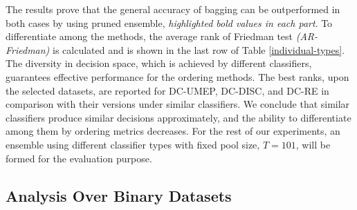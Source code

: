The results prove that the general accuracy of bagging can be outperformed in both cases by using pruned ensemble, \textit{highlighted bold values in each part}. To differentiate among the methods, the average rank of Friedman test \cite{friedman1937} \textit{(AR-Friedman)} is calculated and is shown in the last row of Table \ref{individual-types}. The diversity in decision space, which is achieved by different classifiers, guarantees effective performance for the ordering methods. The best ranks, upon the selected datasets, are reported for DC-UMEP, DC-DISC, and DC-RE in comparison with their versions under similar classifiers. We conclude that similar classifiers produce similar decisions approximately, and the ability to differentiate among them by ordering metrics decreases. For the rest of our experiments, an ensemble using different classifier types with fixed pool size, $T=101$, will be formed for the evaluation purpose. 

\subsection{Analysis Over Binary Datasets} \label{overbinary}


